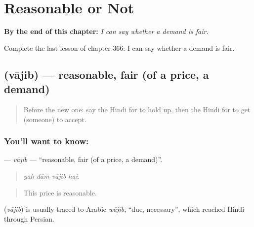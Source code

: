
\chapter{Reasonable or Not}
\label{ch:hi-reasonable-or-not}

\begin{chapteropening}
\textbf{By the end of this chapter:} \emph{I can say whether a demand is fair.}

Complete the last lesson of chapter 366: I can say whether a demand is fair.
\end{chapteropening}

\section[\texorpdfstring{\hi{वाजिब} (vājib)}{वाजिब (vājib)}]{ (vājib) — reasonable, fair (of a price, a demand)}

\label{lesson:HI-C366-vajib}



\begin{quote}
Before the new one: say the Hindi for to hold up, then the Hindi for to get (someone) to accept.
\end{quote}

\subsection*{You'll want to know: }
\textbf{} — \emph{vājib} — \textquotedblleft{}reasonable, fair (of a price, a demand)\textquotedblright{}.

\begin{quote}
   
\end{quote}

\begin{quote}
\emph{yah dām vājib hai.}
\end{quote}

\begin{quote}
This price is reasonable.
\end{quote}

\begin{cousinweb}
\textbf{} (\emph{vājib}) is usually traced to Arabic \emph{wājib}, \textquotedblleft{}due, necessary\textquotedblright{}, which reached Hindi through Persian.
\end{cousinweb}

